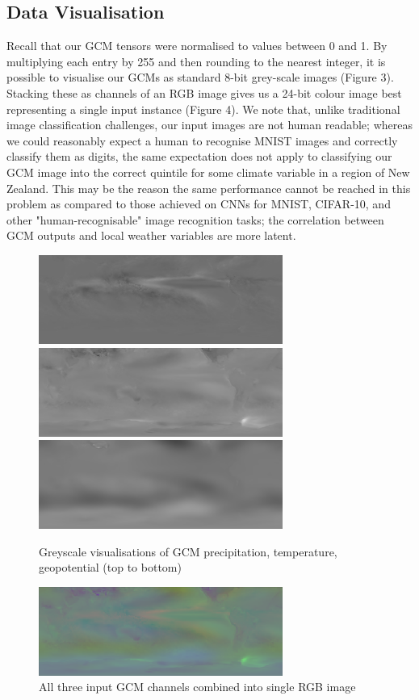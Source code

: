 \documentclass[11pt,a4paper, titlepage]{article}
\begin{document}
\subsection{Data Visualisation}
Recall that our GCM tensors were normalised to values between 0 and 1. By multiplying each entry by 255 and then rounding to the nearest integer, it is possible to visualise our GCMs as standard 8-bit grey-scale images (Figure 3). Stacking these as channels of an RGB image gives us a 24-bit colour image best representing a single input instance (Figure 4). We note that, unlike traditional image classification challenges, our input images are not human readable; whereas we could reasonably expect a human to recognise MNIST images and correctly classify them as digits, the same expectation does not apply to classifying our GCM image into the correct quintile for some climate variable in a region of New Zealand. This may be the reason the same performance cannot be reached in this problem as compared to those achieved on CNNs for MNIST, CIFAR-10, and other "human-recognisable" image recognition tasks; the correlation between GCM outputs and local weather variables are more latent.
\pagebreak

\begin{figure}[h]
	\begin{center}
	\includegraphics[width=8cm]{images/Figure_1}
	\includegraphics[width=8cm]{images/Figure_2}
	\includegraphics[width=8cm]{images/Figure_3}
	\caption{Greyscale visualisations of GCM precipitation, temperature, geopotential (top to bottom)}
	\end{center}
\end{figure}
\begin{figure}[h]
	\begin{center}
	\includegraphics[width=8cm]{images/Figure_RGB}
	\caption{All three input GCM channels combined into single RGB image}
	\end{center}
\end{figure}
\end{document}
